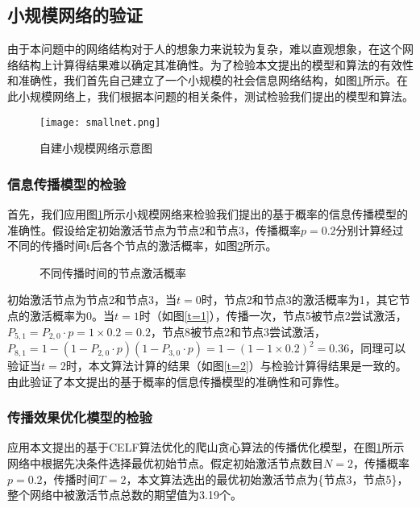 \documentclass[UTF8]{ctexart}
\begin{document}
\subsection{小规模网络的验证}
由于本问题中的网络结构对于人的想象力来说较为复杂，难以直观想象，在这个网络结构上计算得结果难以确定其准确性。为了检验本文提出的模型和算法的有效性和准确性，我们首先自己建立了一个小规模的社会信息网络结构，如图\ref{小网络}所示。在此小规模网络上，我们根据本问题的相关条件，测试检验我们提出的模型和算法。

\begin{figure}[h!]
	\centering
	\texttt{[image: smallnet.png]}
	\caption{自建小规模网络示意图}
	\label{小网络}
\end{figure}

\subsubsection{信息传播模型的检验}
首先，我们应用图\ref{小网络}所示小规模网络来检验我们提出的基于概率的信息传播模型的准确性。假设给定初始激活节点为节点2和节点3，传播概率$p=0.2$分别计算经过不同的传播时间t后各个节点的激活概率，如图\ref{不同传播时间的节点激活概率}所示。

\begin{figure}[h!]
	\centering
	\subfigure[$t=1$]{
		\label{t=1} %
		\texttt{[image: t=1.png]}}
	\hspace{0.5in} \subfigure[$t=2$]{
		\label{t=2} %
		\texttt{[image: t=2.png]}}
	\caption{不同传播时间的节点激活概率}
	\label{不同传播时间的节点激活概率} %
\end{figure}

初始激活节点为节点2和节点3，当$t=0$时，节点2和节点3的激活概率为1，其它节点的激活概率为0。当$t=1$时（如图\ref{t=1}），传播一次，节点5被节点2尝试激活，$P_{5,1}=P_{2,0}\cdot p=1\times 0.2=0.2$，节点8被节点2和节点3尝试激活，$P_{8,1}=1-(1-P_{2,0}\cdot p)(1-P_{3,0}\cdot p) = 1-(1-1\times 0.2)^2=0.36$，同理可以验证当$t=2$时，本文算法计算的结果（如图\ref{t=2}）与检验计算得结果是一致的。由此验证了本文提出的基于概率的信息传播模型的准确性和可靠性。

\subsubsection{传播效果优化模型的检验}
应用本文提出的基于CELF算法优化的爬山贪心算法的传播优化模型，在图\ref{小网络}所示网络中根据先决条件选择最优初始节点。假定初始激活节点数目$N=2$，传播概率$p=0.2$，传播时间$T=2$，本文算法选出的最优初始激活节点为\{节点3，节点5\}，整个网络中被激活节点总数的期望值为3.19个。
\end{document}
